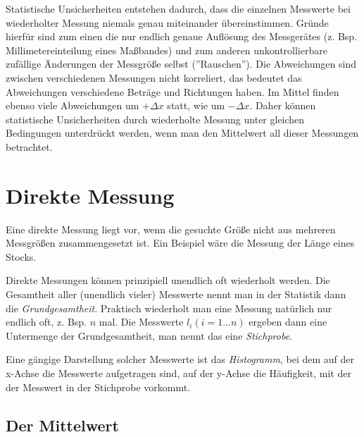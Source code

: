 \label{ssect:StatistUnsicher}
Statistische Unsicherheiten entstehen dadurch, dass die einzelnen Messwerte bei wiederholter Messung niemals genau miteinander übereinstimmen. Gründe hierfür sind zum einen die nur endlich genaue Auflösung des Messgerätes (z. Bsp. Millimetereinteilung eines Maßbandes) und zum anderen unkontrollierbare zufällige Änderungen der Messgröße selbst (''Rauschen''). Die Abweichungen sind zwischen verschiedenen Messungen nicht korreliert, das bedeutet das Abweichungen verschiedene Beträge und Richtungen haben. Im Mittel finden ebenso viele Abweichungen um $+\Delta x$ statt, wie um $-\Delta x$. Daher können statistische Unsicherheiten durch wiederholte Messung unter gleichen Bedingungen unterdrückt werden, wenn man den Mittelwert all dieser Messungen betrachtet.

\section{Direkte Messung}

Eine direkte Messung liegt vor, wenn die gesuchte Größe nicht aus mehreren Messgrößen zusammengesetzt ist. Ein Beispiel wäre die Messung der Länge eines Stocks.

Direkte Messungen können prinzipiell unendlich oft wiederholt werden. Die Gesamtheit aller (unendlich vieler) Messwerte nennt man in der Statistik dann die \textit{Grundgesamtheit}. Praktisch wiederholt man eine Messung natürlich nur endlich oft, z. Bsp. $n$ mal. Die Messwerte $l_i (i=1...n)$ ergeben dann eine Untermenge der Grundgesamtheit, man nennt das eine \textit{Stichprobe}. 

Eine gängige Darstellung solcher Messwerte ist das \textit{Histogramm}, bei dem auf der x-Achse die Messwerte aufgetragen sind, auf der y-Achse die Häufigkeit, mit der der Messwert in der Stichprobe vorkommt.


\subsection{Der Mittelwert}

